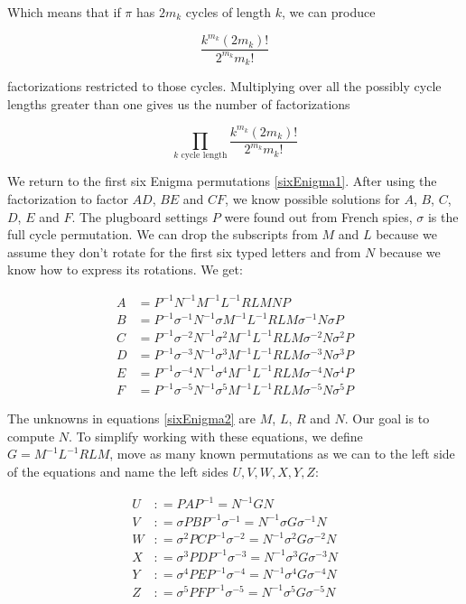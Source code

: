 Which means that if $\pi$ has $2m_k$ cycles of length $k$, we can produce 

$$
\frac{k^{m_k} (2m_k)!}{2^{m_k} m_k!}
$$

factorizations restricted to those cycles. Multiplying over all the possibly cycle lengths greater than one gives us the number of factorizations

$$
\prod_{k \text{ cycle length}}\frac{k^{m_k} (2m_k)!}{2^{m_k} m_k!}
$$

We return to the first six Enigma permutations \ref{sixEnigma1}. After using the factorization to factor $AD$, $BE$ and $CF$, we know possible solutions for $A$, $B$, $C$, $D$, $E$ and $F$. The plugboard settings $P$ were found out from French spies, $\sigma$ is the full cycle permutation. We can drop the subscripts from $M$ and $L$ because we assume they don't rotate for the first six typed letters and from $N$ because we know how to express its rotations. We get:

\begin{equation} \label{sixEnigma2}
\begin{split}
A &= P^{-1} N^{-1} M^{-1} L^{-1} R L M N P \\
B &= P^{-1} \sigma^{-1} N^{-1} \sigma M^{-1} L^{-1} R L M \sigma^{-1} N \sigma P \\
C &= P^{-1} \sigma^{-2} N^{-1} \sigma^{2} M^{-1} L^{-1} R L M \sigma^{-2} N \sigma^{2} P \\
D &= P^{-1} \sigma^{-3} N^{-1} \sigma^{3} M^{-1} L^{-1} R L M \sigma^{-3} N \sigma^{3} P \\
E &= P^{-1} \sigma^{-4} N^{-1} \sigma^{4} M^{-1} L^{-1} R L M \sigma^{-4} N \sigma^{4} P \\
F &= P^{-1} \sigma^{-5} N^{-1} \sigma^{5} M^{-1} L^{-1} R L M \sigma^{-5} N \sigma^{5} P 
\end{split}
\end{equation}

The unknowns in equations \ref{sixEnigma2} are $M$, $L$, $R$ and $N$. Our goal is to compute $N$. To simplify working with these equations, we define $G=M^{-1} L^{-1} R L M$, move as many known permutations as we can to the left side of the equations and name the left sides $U, V, W, X, Y, Z$:

\begin{equation} \label{sixEnigma3}
\begin{split}
U & \mathrel{\mathop:}= P A P^{-1} = N^{-1} G N \\
V & \mathrel{\mathop:}= \sigma P B P^{-1} \sigma^{-1} = N^{-1} \sigma G \sigma^{-1} N \\
W & \mathrel{\mathop:}= \sigma^{2} P C P^{-1} \sigma^{-2} = N^{-1} \sigma^{2} G \sigma^{-2} N \\
X & \mathrel{\mathop:}= \sigma^{3} P D P^{-1} \sigma^{-3} = N^{-1} \sigma^{3} G \sigma^{-3} N \\
Y & \mathrel{\mathop:}= \sigma^{4} P E P^{-1} \sigma^{-4} = N^{-1} \sigma^{4} G \sigma^{-4} N \\
Z & \mathrel{\mathop:}= \sigma^{5} P F P^{-1} \sigma^{-5} = N^{-1} \sigma^{5} G \sigma^{-5} N 
\end{split}
\end{equation}

